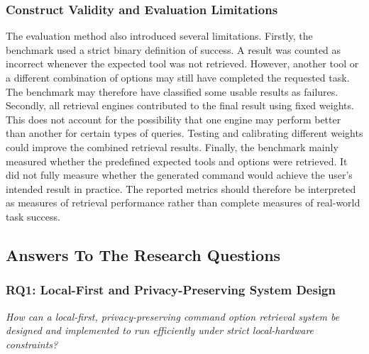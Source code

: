 \subsubsection{Construct Validity and Evaluation Limitations}

The evaluation method also introduced several limitations. Firstly, the benchmark used a strict binary definition of success. A result was counted as incorrect whenever the expected tool was not retrieved. However, another tool or a different combination of options may still have completed the requested task. The benchmark may therefore have classified some usable results as failures. Secondly, all retrieval engines contributed to the final result using fixed weights. This does not account for the possibility that one engine may perform better than another for certain types of queries. Testing and calibrating different weights could improve the combined retrieval results. Finally, the benchmark mainly measured whether the predefined expected tools and options were retrieved. It did not fully measure whether the generated command would achieve the user’s intended result in practice. The reported metrics should therefore be interpreted as measures of retrieval performance rather than complete measures of real-world task success.

\subsection{Answers To The Research Questions}

\subsubsection{RQ1: Local-First and Privacy-Preserving System Design}

\textit{How can a local-first, privacy-preserving command option retrieval system be designed and implemented to run efficiently under strict local-hardware constraints?}


